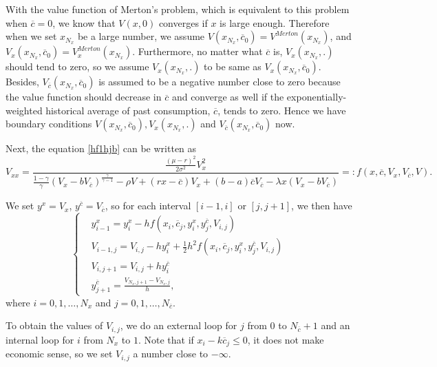 \documentclass[a4paper]{article}
\theoremstyle{definition}
\numberwithin{equation}{section}
\begin{document}
With the value function of Merton's problem, which is equivalent to this problem when $\overline c=0$, we know that $V(x,0)$ converges if $x$ is large enough. Therefore when we set $x_{N_x}$ be a large number, we assume 
$V(x_{N_x},\overline c_0)=V^{Merton}(x_{N_x})$, and $V_x(x_{N_x},\overline c_0)=V^{Merton}_x(x_{N_x})$. Furthermore, no matter what $\overline c$ is, $V_x(x_{N_x},.)$ should tend to zero, so we assume $V_x(x_{N_x},.)$ to be same as $V_x(x_{N_x},\overline c_0)$. Besides, $V_{\overline c}(x_{N_x},\overline c_0)$ is assumed to be a negative number close to zero because the value function should decrease in $\overline c$ and converge as well if the exponentially-weighted historical average of past consumption, $\overline c$, tends to zero. Hence we have boundary conditions $V(x_{N_x},\overline c_0),V_x(x_{N_x},.)$ and $V_{\overline c}(x_{N_x},\overline c_0)$ now.

Next, the equation \eqref{hf1hjb} can be written as
$$V_{xx}=\frac{\frac{(\mu-r)^2}{2\sigma^2}V_x^2}{\frac{1-\gamma}{\gamma}(V_x-bV_{\overline c})^\frac{\gamma}{\gamma-1}-\rho V+(rx-\overline c)V_x+(b-a)\overline cV_{\overline c}-\lambda x(V_x-bV_{\overline c})}=:f(x,\overline c,V_x,V_{\overline c},V).$$

We set $y^x=V_x$, $y^{\overline c}=V_{\overline c}$, so for each interval $[i-1,i]$ or $[j,j+1]$, we then have
\begin{equation}\nonumber
\left\{
\begin{aligned}
&y^x_{i-1}=y^x_i-hf(x_i,\overline c_j,y^x_i,y^{\overline c}_j,V_{i,j})\\
&V_{i-1,j}=V_{i,j}-hy^x_i+\frac{1}{2}h^2f(x_i,\overline c_j,y^x_i,y^{\overline c}_j,V_{i,j})\\
&V_{i,j+1}=V_{i,j}+hy^{\overline c}_i\\
&y^{\overline c}_{j+1}=\frac{V_{N_x,j+1}-V_{N_x,j}}{h},
\end{aligned}
\right.
\end{equation}
where $i=0,1,\dots,N_x$ and $j=0,1,\dots,N_{\overline c}$.

To obtain the values of $V_{i,j}$, we do an external loop for $j$ from $0$ to $N_{\overline c}+1$ and an internal loop for $i$ from $N_x$ to $1$. Note that if $x_i-k\overline c_j\leq0$, it does not make economic sense, so we set $V_{i,j}$ a number close to $-\infty$.
\end{document}
